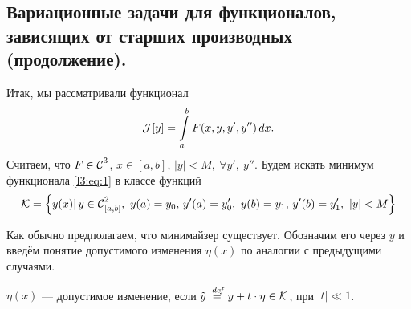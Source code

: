 \chapter{}
\label{lecture3}
\section[Задачи для функционалов, зависящих от старших производных (продолжение).]{Вариационные задачи для функционалов, зависящих от старших производных (продолжение).}
\label{lecture3section1}

Итак, мы рассматривали функционал 
\begin{equation}
	\label{l3:eq:1}
	\hfill\J[y]=\int\limits_a^b F(x,y,y',y'')\,dx.\hfill
\end{equation}
Считаем, что $F\in\mathcal{C}{\mathstrut}^{3}_{}$, $x\in[a,b]$, $|y|<M,\ \forall y',\ y''$. 
Будем искать минимум функционала \eqref{l3:eq:1} в классе функций
\begin{equation*}
	\hfill\K=\left\{y(x)|\,y\in\Cfn[{[a,b]}]{2},\ y(a)=y_0,\,y'(a)=y'_0,\ y(b)=y_1,\,y'(b)=y'_1,\ |y|<M\right\}\hfill
\end{equation*}

Как обычно предполагаем, что минимайзер существует. Обозначим его через $y$ и введём понятие допустимого изменения $\eta(x)$ по аналогии с предыдущими случаями.
\begin{_def}
	$\eta(x)$ --- допустимое изменение, если $\tilde{y}\stackrel{\hspace{0.09 cm}de\!f}{=} y+t\cdot\eta\in\mathcal{K}$, при $|t|\ll1$.
\end{_def} 

